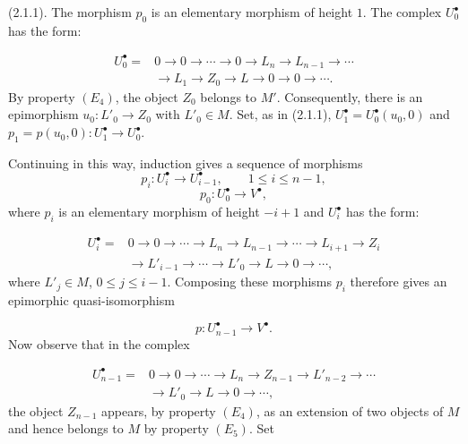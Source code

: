 \clearpage
{}%
\begingroup\small\setlength{\parskip}{0pt}\setlength{\emergencystretch}{1.5em}
\setlength{\abovedisplayskip}{4pt plus 2pt minus 2pt}%
\setlength{\belowdisplayskip}{4pt plus 2pt minus 2pt}%

(2.1.1). The morphism $p_0$ is an elementary morphism of height $1$.
The complex $U_0^\bullet$ has the form:

\[
\begin{aligned}
U_0^\bullet={}&0\longrightarrow0\longrightarrow\cdots\longrightarrow0
\longrightarrow L_n\longrightarrow L_{n-1}\longrightarrow\cdots\\
&\longrightarrow L_1\longrightarrow Z_0\longrightarrow L
\longrightarrow0\longrightarrow0\longrightarrow\cdots.
\end{aligned}
\]
By property $(E_4)$, the object $Z_0$ belongs to $M'$. Consequently,
there is an epimorphism $u_0\colon L'_0\longrightarrow Z_0$ with
$L'_0\in M$. Set, as in (2.1.1),
$U_1^\bullet=U_0^\bullet(u_0,0)$ and
$p_1=p(u_0,0)\colon U_1^\bullet\longrightarrow U_0^\bullet$.

Continuing in this way, induction gives a sequence of morphisms
\[
p_i\colon U_i^\bullet\longrightarrow U_{i-1}^\bullet,
\qquad 1\leq i\leq n-1,
\]
\[
p_0\colon U_0^\bullet\longrightarrow V^\bullet,
\]
where $p_i$ is an elementary morphism of height $-i+1$ and
$U_i^\bullet$ has the form:

\[
\begin{aligned}
U_i^\bullet={}&0\longrightarrow0\longrightarrow\cdots
\longrightarrow L_n\longrightarrow L_{n-1}\longrightarrow\cdots
\longrightarrow L_{i+1}\longrightarrow Z_i\\
&\longrightarrow L'_{i-1}\longrightarrow\cdots\longrightarrow L'_0
\longrightarrow L\longrightarrow0\longrightarrow\cdots ,
\end{aligned}
\]
where $L'_j\in M$, $0\leq j\leq i-1$. Composing these morphisms $p_i$
therefore gives an epimorphic quasi-isomorphism

\[
p\colon U_{n-1}^\bullet\longrightarrow V^\bullet.
\]
Now observe that in the complex

\[
\begin{aligned}
U_{n-1}^\bullet={}&0\longrightarrow0\longrightarrow\cdots
\longrightarrow L_n\longrightarrow Z_{n-1}\longrightarrow L'_{n-2}
\longrightarrow\cdots\\
&\longrightarrow L'_0\longrightarrow L\longrightarrow0
\longrightarrow\cdots ,
\end{aligned}
\]
the object $Z_{n-1}$ appears, by property $(E_4)$, as an extension of two
objects of $M$ and hence belongs to $M$ by property $(E_5)$. Set

